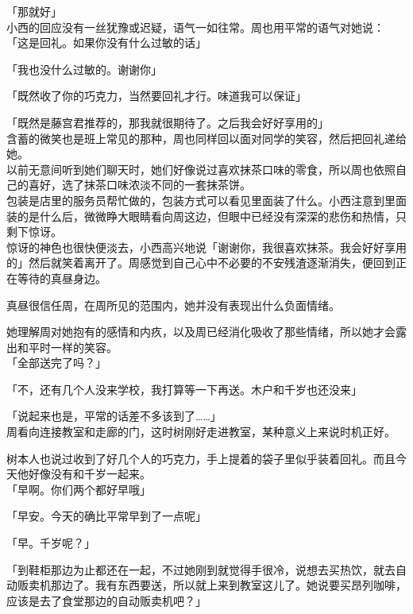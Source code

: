 「那就好」\\

小西的回应没有一丝犹豫或迟疑，语气一如往常。周也用平常的语气对她说：\\

「这是回礼。如果你没有什么过敏的话」

「我也没什么过敏的。谢谢你」

「既然收了你的巧克力，当然要回礼才行。味道我可以保证」

「既然是藤宫君推荐的，那我就很期待了。之后我会好好享用的」\\

含蓄的微笑也是班上常见的那种，周也同样回以面对同学的笑容，然后把回礼递给她。\\

以前无意间听到她们聊天时，她们好像说过喜欢抹茶口味的零食，所以周也依照自己的喜好，选了抹茶口味浓淡不同的一套抹茶饼。\\

包装是店里的服务员帮忙做的，包装方式可以看见里面装了什么。小西注意到里面装的是什么后，微微睁大眼睛看向周这边，但眼中已经没有深深的悲伤和热情，只剩下惊讶。\\

惊讶的神色也很快便淡去，小西高兴地说「谢谢你，我很喜欢抹茶。我会好好享用的」然后就笑着离开了。周感觉到自己心中不必要的不安残渣逐渐消失，便回到正在等待的真昼身边。

真昼很信任周，在周所见的范围内，她并没有表现出什么负面情绪。

她理解周对她抱有的感情和内疚，以及周已经消化吸收了那些情绪，所以她才会露出和平时一样的笑容。\\

「全部送完了吗？」

「不，还有几个人没来学校，我打算等一下再送。木户和千岁也还没来」

「说起来也是，平常的话差不多该到了……」\\

周看向连接教室和走廊的门，这时树刚好走进教室，某种意义上来说时机正好。

树本人也说过收到了好几个人的巧克力，手上提着的袋子里似乎装着回礼。而且今天他好像没有和千岁一起来。\\

「早啊。你们两个都好早哦」

「早安。今天的确比平常早到了一点呢」

「早。千岁呢？」

「到鞋柜那边为止都还在一起，不过她刚到就觉得手很冷，说想去买热饮，就去自动贩卖机那边了。我有东西要送，所以就上来到教室这儿了。她说要买昂列咖啡，应该是去了食堂那边的自动贩卖机吧？」\\

